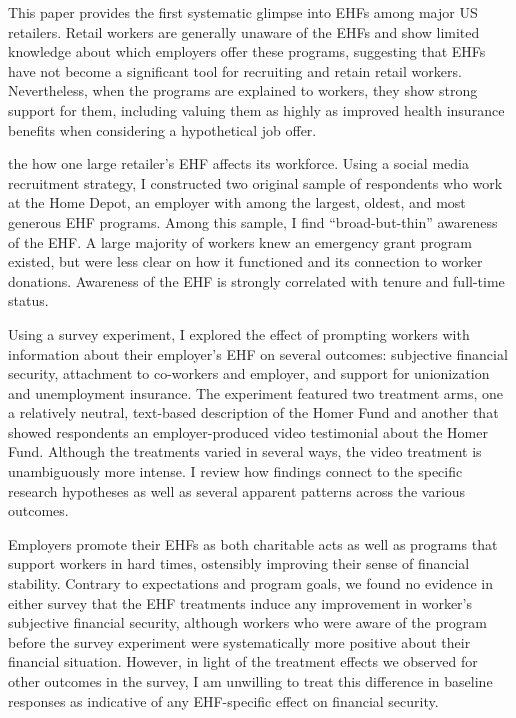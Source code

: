 \documentclass[
  11pt,
  oneside]{article}
\begin{document}
This paper provides the first systematic glimpse into EHFs among major US retailers. Retail workers are generally unaware of the EHFs and show limited knowledge about which employers offer these programs, suggesting that EHFs have not become a significant tool for recruiting and retain retail workers. Nevertheless, when the programs are explained to workers, they show strong support for them, including valuing them as highly as improved health insurance benefits when considering a hypothetical job offer.

the how one large retailer's EHF affects its workforce. Using a social media recruitment strategy, I constructed two original sample of respondents who work at the Home Depot, an employer with among the largest, oldest, and most generous EHF programs. Among this sample, I find ``broad-but-thin'' awareness of the EHF. A large majority of workers knew an emergency grant program existed, but were less clear on how it functioned and its connection to worker donations. Awareness of the EHF is strongly correlated with tenure and full-time status.

Using a survey experiment, I explored the effect of prompting workers with information about their employer's EHF on several outcomes: subjective financial security, attachment to co-workers and employer, and support for unionization and unemployment insurance. The experiment featured two treatment arms, one a relatively neutral, text-based description of the Homer Fund and another that showed respondents an employer-produced video testimonial about the Homer Fund. Although the treatments varied in several ways, the video treatment is unambiguously more intense. I review how findings connect to the specific research hypotheses as well as several apparent patterns across the various outcomes.

Employers promote their EHFs as both charitable acts as well as programs that support workers in hard times, ostensibly improving their sense of financial stability. Contrary to expectations and program goals, we found no evidence in either survey that the EHF treatments induce any improvement in worker's subjective financial security, although workers who were aware of the program before the survey experiment were systematically more positive about their financial situation. However, in light of the treatment effects we observed for other outcomes in the survey, I am unwilling to treat this difference in baseline responses as indicative of any EHF-specific effect on financial security.
\end{document}
